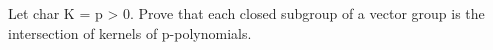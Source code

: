 Let char K = p > 0. Prove that each closed subgroup of a vector group is the intersection of kernels of p-polynomials.
